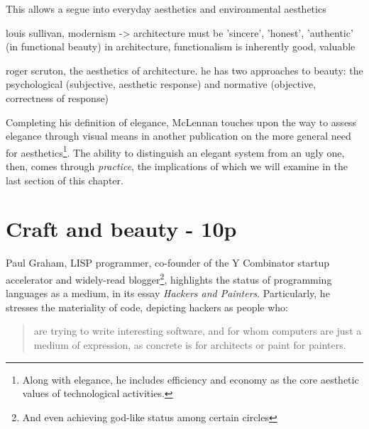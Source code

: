 This allows a segue into everyday aesthetics and environmental aesthetics

louis sullivan, modernism -> architecture must be 'sincere', 'honest', 'authentic' (in functional beauty) in architecture, functionalism is inherently good, valuable

roger scruton, the aesthetics of architecture. he has two approaches to beauty: the psychological (subjective, aesthetic response) and normative (objective, correctness of response)


Completing his definition of elegance, McLennan touches upon the way to assess elegance through visual means in another publication on the more general need for aesthetics\footnote{Along with elegance, he includes efficiency and economy as the core aesthetic values of technological activities.}. The ability to distinguish an elegant system from an ugly one, then, comes through \emph{practice}, the implications of which we will examine in the last section of this chapter\cite{schummer_aesthetic_2009}.


\pagebreak

\section{Craft and beauty - 10p}
\label{sec:craft}


Paul Graham, LISP programmer, co-founder of the Y Combinator startup accelerator and widely-read blogger\footnote{And even achieving god-like status among certain circles\cite{eadicicco_startup_2014}}, highlights the status of programming languages as a medium, in its essay \emph{Hackers and Painters}\cite{graham_hackers_2003}. Particularly, he stresses the materiality of code, depicting hackers as people who:

\begin{quote}
 are trying to write interesting software, and for whom computers are just a medium of expression, as concrete is for architects or paint for painters.
\end{quote}

